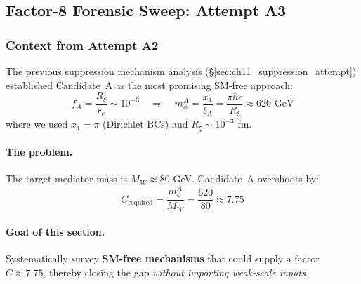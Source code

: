 
\subsection{Factor-8 Forensic Sweep: Attempt A3}
\label{sec:ch11_factor8_attempt}

\subsubsection{Context from Attempt A2}

The previous suppression mechanism analysis (\S\ref{sec:ch11_suppression_attempt})
established Candidate~A as the most promising SM-free approach:
\begin{equation}
    f_A = \frac{R_\xi}{r_e} \sim 10^{-3}
    \quad\Rightarrow\quad
    m_\phi^A = \frac{x_1}{\ell_A} = \frac{\pi \hbar c}{R_\xi}
    \approx 620 \text{ GeV}
    \label{eq:ch11_a2_recap}
\end{equation}
where we used $x_1 = \pi$ (Dirichlet BCs) and $R_\xi \sim 10^{-3}$ fm.

\paragraph{The problem.}
The target mediator mass is $M_W \approx 80$ GeV. Candidate~A overshoots by:
\begin{equation}
    \boxed{
    C_{\text{required}} = \frac{m_\phi^A}{M_W} = \frac{620}{80} \approx 7.75
    }
    \label{eq:ch11_factor8_required}
\end{equation}

\paragraph{Goal of this section.}
Systematically survey \textbf{SM-free mechanisms} that could supply a factor
$C \approx 7.75$, thereby closing the gap \emph{without importing weak-scale inputs}.

